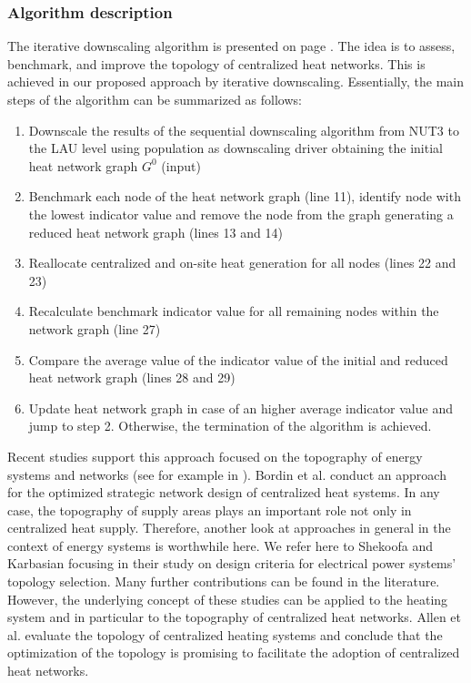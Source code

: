\newpage
\subsubsection{Algorithm description}
The iterative downscaling algorithm is presented on page \pageref{Alg:2}. The idea is to assess, benchmark, and improve the topology of centralized heat networks. This is achieved in our proposed approach by iterative downscaling. Essentially, the main steps of the algorithm can be summarized as follows:

\begin{enumerate}[nolistsep]
	\item Downscale the results of the sequential downscaling algorithm from NUT3 to the LAU level using population as downscaling driver obtaining the initial heat network graph $G^{0}$ (input)
	\item Benchmark each node of the heat network graph (line 11), identify node with the lowest indicator value and remove the node from the graph generating a reduced heat network graph (lines 13 and 14)
	\item Reallocate centralized and on-site heat generation for all nodes (lines 22 and 23)
	\item Recalculate benchmark indicator value for all remaining nodes within the network graph (line 27)
	\item Compare the average value of the indicator value of the initial and reduced heat network graph (lines 28 and 29)
	\item Update heat network graph in case of an higher average indicator value and jump to step 2. Otherwise, the termination of the algorithm is achieved. 
\end{enumerate}
\vspace{0.5cm}

Recent studies support this approach focused on the topography of energy systems and networks (see for example in \cite{abuelnasr2018examining}). Bordin et al. \cite{bordin2016optimization} conduct an approach for the optimized strategic network design of centralized heat systems. In any case, the topography of supply areas plays an important role not only in centralized heat supply. Therefore, another look at approaches in general in the context of energy systems is worthwhile here. We refer here to Shekoofa and Karbasian \cite{shekoofa2013design} focusing in their study on design criteria for electrical power systems' topology selection. Many further contributions can be found in the literature. However, the underlying concept of these studies can be applied to the heating system and in particular to the topography of centralized heat networks. Allen et al. \cite{allen2020evaluation} evaluate the topology of centralized heating systems and conclude that the optimization of the topology is promising to facilitate the adoption of centralized heat networks. 


